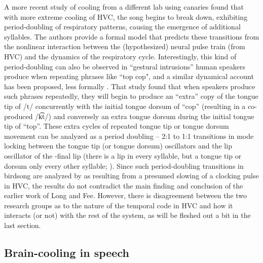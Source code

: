 \documentclass[output=paper,
modfonts
]{LSP/langsci}
\begin{document}
A more recent study of cooling from a different lab using canaries \citep{Goldin2013} found that with more extreme cooling of HVC, the song begins to break down, exhibiting period-doubling of respiratory patterns, causing the emergence of additional syllables. The authors provide a formal model that predicts these transitions from the nonlinear interaction between the (hypothesized) neural pulse train (from HVC) and the dynamics of the respiratory cycle. Interestingly, this kind of period-doubling can also be observed in ``gestural intrusions'' human speakers produce when repeating phrases like ``top cop", and a similar dynamical account has been proposed, less formally \citep{Goldstein2007}.  That study found that when speakers produce such phrases repeatedly, they will begin to produce an ``extra'' copy of the tongue tip  of /t/ concurrently with the
initial tongue dorsum  of ``cop'' (resulting in a co-produced /k͡t/) and conversely an extra tongue dorsum  during the initial tongue tip  of ``top''. These extra cycles of repeated tongue tip or tongue dorsum movement can be analyzed as a period doubling -- 2:1 to 1:1 transitions in  mode locking between the tongue tip (or tongue dorsum) oscillators and the lip oscillator of the -final lip  (there is a lip  in every syllable, but a tongue tip or dorsum  only every other syllable; \citealt{Goldstein2007}).
Since such period-doubling transitions in birdsong are analyzed by \citet{Goldin2013}  as resulting from a presumed slowing of a clocking pulse in HVC, the results do not contradict the main finding and conclusion of the earlier work of Long and Fee. However, there is disagreement between the two research groups as to the nature of the temporal code in HVC and how it interacts (or not) with the rest of the system, as will be fleshed out a bit in the last section.

\subsection{Brain-cooling in speech}
\end{document}
